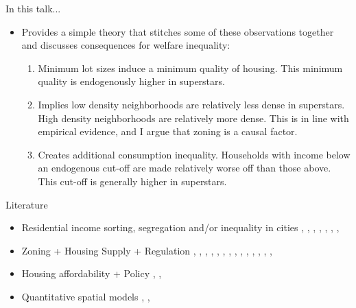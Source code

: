 \documentclass{beamer}
\theoremstyle{plain}
\begin{document}
\begin{frame}{In this talk...}
	\begin{itemize}
		\itemsep1em
		\item Provides a simple theory that stitches some of these observations together and discusses consequences for welfare inequality: \pause
		\begin{enumerate}
			\itemsep1em
			\color{black}
			\item  Minimum lot sizes induce a minimum quality of housing. This minimum quality is endogenously higher in superstars.  \pause
			\item Implies \color{blue}low \color{black} density neighborhoods are relatively \color{blue} less \color{black} dense in superstars. \color{red}High \color{black} density neighborhoods are relatively \color{red}more  \color{black} dense. This is in line with empirical evidence, and I argue that zoning is a causal factor.\pause
			\item Creates additional consumption inequality. Households with income below an endogenous cut-off are made relatively worse off than those above. This cut-off is generally higher in superstars.
		\end{enumerate}
	\end{itemize}
\end{frame}

\begin{frame}{Literature}
\fontsize{8pt}{7.2}	
\begin{itemize}
	\itemsep4em
\item \color{red} Residential income sorting, segregation and/or inequality in cities \color{black} \cite{Coutureetal}, \cite{parispoor},  \cite{urbanrevival}, \cite{su2021}, \cite{endogentrification}, \cite{FogliGuerrieri}, \cite{ineqcitysize}, \cite{spatialsorting} 

\item \color{purple} Zoning + Housing Supply + Regulation \color{black} \cite{keepingpeopleout}, \cite{calabresetal}, \cite{Hamilton1975}, \cite{hamilton1976}, \cite{gyourkomolloy}, \cite{superstarcities}, \cite{mastwarding}, \cite{turner2014}, \cite{bbheight}, \cite{spatialSizeofUSUrbAreas}, \cite{BSH}, \cite{hilber2021} \cite{HILBER2013}, \cite{op2014}, \cite{davidoff2022}, \cite{saiz2010}

\item \color{orange} Housing affordability + Policy \color{black} \cite{asquithetallocaleffects}, \cite{albouyetal}, \cite{mastspillovers}  

\item \color{teal} Quantitative spatial models \color{black} \cite{quantspatial}, \cite{berlinwall}, \cite{transportinfrastructure}
\end{itemize}
\end{frame}
\end{document}

